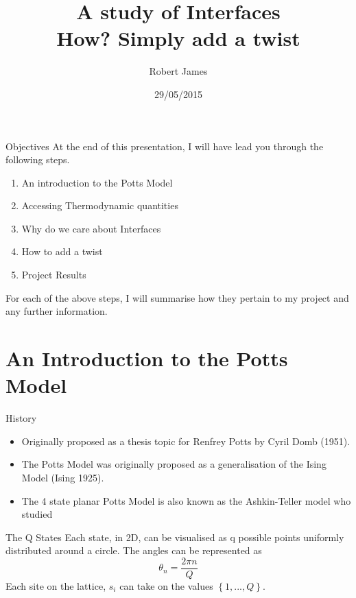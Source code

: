 \documentclass[12pt]{beamer}
\author{Robert James}
\title{A study of Interfaces\\ How? Simply add a twist}
\institute{Swansea University}
\date{29/05/2015}
\begin{document}
\begin{frame}
\titlepage
\end{frame}


\begin{frame}{Objectives}
At the end of this presentation, I will have lead you through the following steps.
\begin{enumerate}
	\item An introduction to the Potts Model
	\item Accessing Thermodynamic quantities
	\item Why do we care about Interfaces
	\item How to add a twist
	\item Project Results
\end{enumerate}

For each of the above steps, I will summarise how they pertain to my project and any further information.

\end{frame}

\section{An Introduction to the Potts Model}
\begin{frame}{History}
\begin{itemize}
	\item Originally proposed as a thesis topic for Renfrey Potts by Cyril Domb (1951).
	\item The Potts Model was originally proposed as a generalisation of the Ising Model (Ising 1925).
	\item The 4 state planar Potts Model is also known as the Ashkin-Teller model who studied 
\end{itemize}
\end{frame}

\begin{frame}{The Q States}
Each state, in 2D, can be visualised as q possible points uniformly distributed around a circle. The angles can be represented as
\begin{equation}
\theta_{n} = \frac{2 \pi n}{Q}
\end{equation}
Each site on the lattice, $s_i$ can take on the values $\left\lbrace 1,...,Q\right\rbrace$.
\end{frame}
\end{document}
